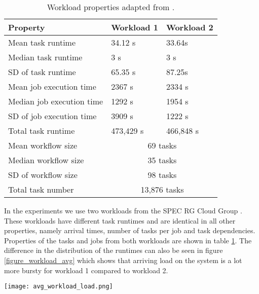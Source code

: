 \documentclass[twocolumn,a4]{scrartcl}
\begin{document}
\begin{table}[h]
\setlength\tabcolsep{2pt}
\begin{tabular}{l l l}
  \hline
  \textbf{Property}         & \textbf{Workload 1} & \textbf{Workload 2} \\
  \hline
  Mean task runtime         & 34.12 s             & 33.64s              \\
  Median task runtime       & 3 s                 & 3 s                 \\
  SD of task runtime        & 65.35 s             & 87.25s              \\
  Mean job execution time   & 2367 s              & 2334 s              \\
  Median job execution time & 1292 s              & 1954 s              \\
  SD of job execution time  & 3909 s              & 1222 s              \\
  Total task runtime        & 473,429 s           & 466,848 s           \\
  Mean workflow size        & \multicolumn{2}{c}{69 tasks}              \\
  Median workflow size      & \multicolumn{2}{c}{35 tasks}              \\
  SD of workflow size       & \multicolumn{2}{c}{98 tasks}              \\
  Total task number         & \multicolumn{2}{c}{13,876 tasks}          \\
  \hline
\end{tabular}
\caption{Workload properties adapted from \cite{DBLP:conf/wosp/IlyushkinAHPGEI17}.}
\label{table_workload_properties}
\end{table}

In the experiments we use two workloads from the SPEC RG Cloud Group \cite{DBLP:conf/wosp/IlyushkinAHPGEI17}. These workloads have different task runtimes and are identical in all other properties, namely arrival times, number of tasks per job and task dependencies. Properties of the tasks and jobs from both workloads are shown in table \ref{table_workload_properties}. The difference in the distribution of the runtimes can also be seen in figure \ref{figure_workload_avg} which shows that arriving load on the system is a lot more bursty for workload 1 compared to workload 2.

\begin{figure*}[h]
  \centering
  \texttt{[image: avg\_workload\_load.png]}
  \caption{Average load, in 15 minute intervals, for workloads 1 (left) and 2 (right)}
  \label{figure_workload_avg}
\end{figure*}
\end{document}
